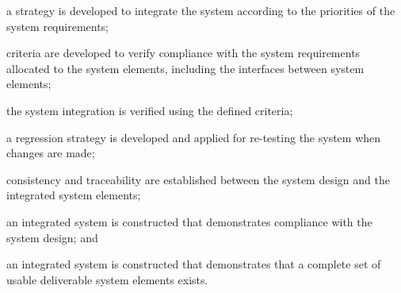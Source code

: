 			\begin{adjustwidth}{2em}{0pt} 

				\begin{compactitem}

					\item a strategy is developed to integrate the system according to the priorities of the system requirements;

					\item criteria are developed to verify compliance with the system requirements allocated to the system elements, including the interfaces between system elements;

					\item the system integration is verified using the defined criteria;

					\item a regression strategy is developed and applied for re-testing the system when changes are made;

					\item consistency and traceability are established between the system design and the integrated system elements;

					\item an integrated system is constructed that demonstrates compliance with the system design; and

					\item an integrated system is constructed that demonstrates that a complete set of usable deliverable system elements exists.

				\end{compactitem}

			\end{adjustwidth}

